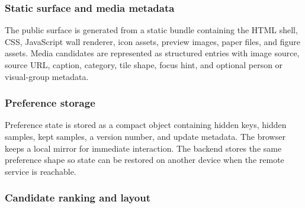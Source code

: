 \documentclass[12pt,letterpaper]{article}
\begin{document}
\subsubsection*{Static surface and media metadata}

The public surface is generated from a static bundle containing the HTML shell, CSS, JavaScript wall renderer, icon assets, preview images, paper files, and figure assets. Media candidates are represented as structured entries with image source, source URL, caption, category, tile shape, focus hint, and optional person or visual-group metadata.

\subsubsection*{Preference storage}

Preference state is stored as a compact object containing hidden keys, hidden samples, kept samples, a version number, and update metadata. The browser keeps a local mirror for immediate interaction. The backend stores the same preference shape so state can be restored on another device when the remote service is reachable.

\subsubsection*{Candidate ranking and layout}
\end{document}
